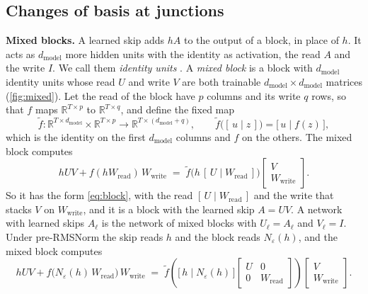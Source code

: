 \documentclass[10pt]{article}
\theoremstyle{definition}
\theoremstyle{remark}
\newcommand{\R}{\mathbb{R}}
\newcommand{\Wread}{W_{\mathrm{read}}}
\newcommand{\Wwrite}{W_{\mathrm{write}}}
\newcommand{\dm}{d_{\mathrm{model}}}
\newcommand{\para}[1]{\smallskip\noindent\textbf{#1}\hspace{0.5em}}
\begin{document}
\subsection{Changes of basis at junctions}\label{app:prf-junction}

\para{Mixed blocks.} A learned skip adds $hA$ to the output of a block, in place of $h$. It acts as $\dm$ more hidden units with the identity as activation, the read $A$ and the write $I$. We call them \emph{identity units} \citep[Section~4]{lin2018resnet}. A \emph{mixed block} is a block with $\dm$ identity units whose read $U$ and write $V$ are both trainable $\dm\times\dm$ matrices (\cref{fig:mixed}). Let the read of the block have $p$ columns and its write $q$ rows, so that $f$ maps $\R^{T\times p}$ to $\R^{T\times q}$, and define the fixed map
\[
\tilde f : \R^{T\times\dm} \times \R^{T\times p} \to \R^{T\times(\dm+q)}, \qquad \tilde f\big([\,u \mid z\,]\big) = \big[\,u \mid f(z)\,\big],
\]
which is the identity on the first $\dm$ columns and $f$ on the others. The mixed block computes
\begin{equation}\label{eq:mixed}
hUV + f(h\Wread)\,\Wwrite \;=\; \tilde f\big(h\,[\,U \mid \Wread\,]\big)\begin{bmatrix} V \\ \Wwrite \end{bmatrix}.
\end{equation}
So it has the form \eqref{eq:block}, with the read $[\,U \mid \Wread\,]$ and the write that stacks $V$ on $\Wwrite$, and it is a block with the learned skip $A = UV$. A network with learned skips $A_\ell$ is the network of mixed blocks with $U_\ell = A_\ell$ and $V_\ell = I$. Under pre-RMSNorm the skip reads $h$ and the block reads $N_\varepsilon(h)$, and the mixed block computes
\begin{equation}\label{eq:prenormblock}
hUV + f\big(N_\varepsilon(h)\,\Wread\big)\,\Wwrite \;=\; \tilde f\left(\big[\,h \mid N_\varepsilon(h)\,\big]\begin{bmatrix} U & 0 \\ 0 & \Wread \end{bmatrix}\right)\begin{bmatrix} V \\ \Wwrite \end{bmatrix}.
\end{equation}
\end{document}
